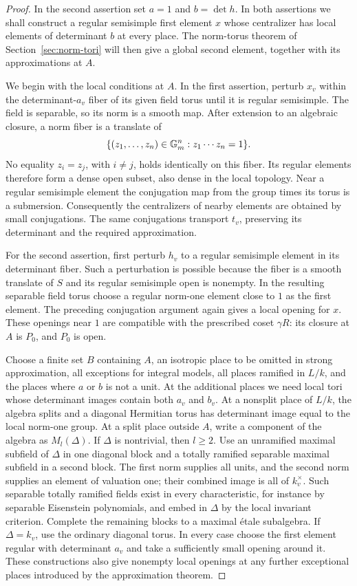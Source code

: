 \begin{proof}
In the second assertion set $a=1$ and $b=\det h$.  In both assertions
we shall construct a regular semisimple first element $x$ whose
centralizer has local elements of determinant $b$ at every place.
The norm-torus theorem of Section~\ref{sec:norm-tori} will then give
a global second element, together with its approximations at $A$.

We begin with the local conditions at $A$.  In the first assertion,
perturb $x_v$ within the determinant-$a_v$ fiber of its given field
torus until it is regular semisimple.  The field is separable, so its
norm is a smooth map.  After extension to an algebraic closure, a norm
fiber is a translate of
\[
 \{(z_1,\ldots,z_n)\in\mathbb G_m^n:z_1\cdots z_n=1\}.
\]
No equality $z_i=z_j$, with $i\ne j$, holds identically on this fiber.
Its regular elements therefore form a dense open subset, also dense
in the local topology.  Near a regular semisimple element the
conjugation map from the group times its torus is a submersion.
Consequently the centralizers of nearby elements are obtained by small
conjugations.  The same conjugations transport $t_v$, preserving its
determinant and the required approximation.

For the second assertion, first perturb $h_v$ to a regular semisimple
element in its determinant fiber.  Such a perturbation is possible
because the fiber is a smooth translate of $S$ and its regular
semisimple open is nonempty.  In the resulting separable field torus
choose a regular norm-one element close to $1$ as the first element.
The preceding conjugation argument again gives a local opening for
$x$.  These openings near $1$ are compatible with the prescribed coset
$\gamma R$: its closure at $A$ is $P_0$, and $P_0$ is open.

Choose a finite set $B$ containing $A$, an isotropic place to be omitted
in strong approximation, all exceptions for integral models, all places
ramified in $L/k$, and the places where $a$ or $b$ is not a unit.
At the additional places we need local tori whose determinant images
contain both $a_v$ and $b_v$.  At a nonsplit place of $L/k$, the algebra
splits and a diagonal Hermitian torus has determinant image equal to
the local norm-one group.  At a split place outside $A$, write a
component of the algebra as $M_l(\Delta)$.  If $\Delta$ is nontrivial,
then $l\geq2$.  Use an unramified maximal subfield of $\Delta$ in one
diagonal block and a totally ramified separable maximal subfield in a
second block.  The first norm supplies all units, and the second norm
supplies an element of valuation one; their combined image is all of
$k_v^\times$.  Such separable totally ramified fields exist in every
characteristic, for instance by separable Eisenstein polynomials, and
embed in $\Delta$ by the local invariant criterion.  Complete the
remaining blocks to a maximal \'etale subalgebra.  If $\Delta=k_v$, use
the ordinary diagonal torus.  In every case choose the first element
regular with determinant $a_v$ and take a sufficiently small opening
around it.  These constructions also give nonempty local openings at
any further exceptional places introduced by the approximation theorem.


\end{proof}

